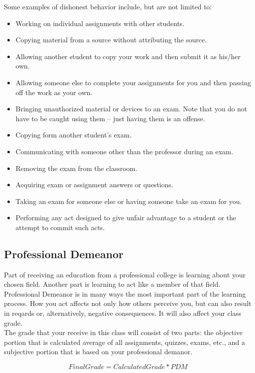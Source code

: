 \documentclass[a4paper,11pt,twocolumn]{article}
\begin{document}
\noindent Some examples of dishonest behavior include, but are not limited to:
\begin{itemize}[topsep=0pt,itemsep=0pt,partopsep=0pt, parsep=0pt]
 \item Working on individual assignments with other students.
 \item Copying material from a source without attributing the source.
 \item Allowing another student to copy your work and then submit it as his/her own.
 \item Allowing someone else to complete your assignments for you and then passing off the work as your own.
 \item Bringing unauthorized material or devices to an exam. Note that you do not have to be caught using them -- just having them is an offense.
 \item Copying form another student's exam.
 \item Communicating with someone other than the professor during an exam.
 \item Removing the exam from the classroom.
 \item Acquiring exam or assignment answers or questions.
 \item Taking an exam for someone else or having someone take an exam for you.
 \item Performing any act designed to give unfair advantage to a student or the attempt to commit such acts.
\end{itemize}

\subsection*{Professional Demeanor}
\noindent Part of receiving an education from a professional college is learning about your chosen field. Another part is learning to act like a member of that field. Professional Demeanor is in many ways the most important part of the learning process. How you act affects not only how others perceive you, but can also result in reqards or, alternatively, negative consequences. It will also affect your class grade.\\

\noindent The grade that your receive in this class will consist of two parts: the objective portion that is calculated average of all assignments, quizzes, exams, etc., and a subjective portion that is based on your professional demanor.

{\color{red}\[Final Grade = Calculated Grade * PDM\]}
\end{document}

